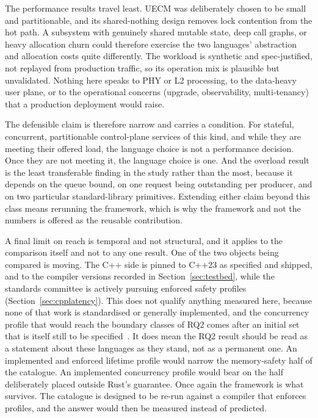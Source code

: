 \documentclass[english,oneside,a4paper,censored,csm,software-track-2020]{HYthesisML}
\begin{document}
The performance
results travel least. UECM was deliberately chosen to be small and
partitionable, and its shared-nothing design removes lock contention from the hot path. A
subsystem with genuinely shared mutable state, deep call graphs, or heavy allocation churn could
therefore exercise the two languages' abstraction and allocation costs quite differently. The
workload is synthetic and spec-justified, not replayed from production traffic, so its operation
mix is plausible but unvalidated. Nothing here speaks to PHY or L2 processing, to the data-heavy
user plane, or to the operational concerns (upgrade, observability, multi-tenancy) that a
production deployment would raise.

The defensible claim is therefore narrow and carries a condition. For
stateful, concurrent, partitionable control-plane services of this kind, and while they are
meeting their offered load, the language choice is not a performance decision. Once they are not
meeting it, the language choice is one. And the overload result is the least transferable finding
in the study rather than the most, because it depends on the queue bound, on one request being
outstanding per producer, and on two particular standard-library primitives. Extending either
claim beyond this class means rerunning the framework, which is why the framework and not the
numbers is offered as the reusable contribution.

A final limit on reach is temporal and not structural, and it applies to the comparison
itself and not to any one result. One of the two objects being compared is moving. The C++
side is pinned to C++23 as specified and shipped, and to the compiler versions recorded in
Section~\ref{sec:testbed}, while the standards committee is actively pursuing enforced safety
profiles (Section~\ref{sec:cpplatency}). This does not qualify anything measured here, because
none of that work is standardised or generally implemented, and the concurrency profile that
would reach the boundary classes of RQ2 comes after an initial set that is itself still to be
specified~\cite{vandevoorde2026profiles}. It does mean the RQ2 result should be read as a
statement about these languages as they stand, not as a permanent one. An implemented and
enforced lifetime profile would narrow the memory-safety half of the catalogue. An implemented
concurrency profile would bear on the half deliberately placed outside Rust's guarantee. Once
again the framework is what survives. The catalogue is designed to be re-run against
a compiler that enforces profiles, and the answer would then be measured instead of predicted.
\end{document}
